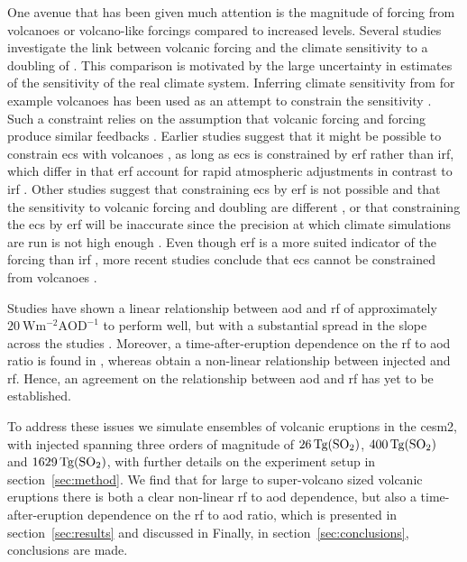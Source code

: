 \documentclass{ametsocV6.1}
\newcommand{\iso}[1][i]{{#1}njected \ce{SO2}}
\begin{document}
One avenue that has been given much attention is the magnitude of forcing from volcanoes
or volcano-like forcings compared to increased  levels. Several studies
investigate the link between volcanic forcing and the climate sensitivity to a doubling
of 
\citep{boer2007,marvel2016,merlis2014,ollila2016,richardson2019,salvi2022,wigley2005}.
This comparison is motivated by the large uncertainty in estimates of the sensitivity of
the real climate system. Inferring climate sensitivity from for example volcanoes has
been used as an attempt to constrain the sensitivity \citep{boer2007}. Such a constraint
relies on the assumption that volcanic forcing and  forcing produce similar
feedbacks \citep{pauling2023}. Earlier studies suggest that it might be possible to
constrain \gls{ecs} with volcanoes \citep{bender2010}, as long as \gls{ecs} is
constrained by \gls{erf} rather than \gls{irf}, which differ in that \gls{erf} account
for rapid atmospheric adjustments in contrast to \gls{irf} \citep{richardson2019}. Other
studies suggest that constraining \gls{ecs} by \gls{erf} is not possible and that the
sensitivity to volcanic forcing and  doubling are different
\citep{douglass2006}, or that constraining the \gls{ecs} by \gls{erf} will be inaccurate
since the precision at which climate simulations are run is not high enough
\citep{boer2007,salvi2022}. Even though \gls{erf} is a more suited indicator of the
forcing than \gls{irf} \citep{marvel2016,richardson2019}, more recent studies conclude
that \gls{ecs} cannot be constrained from volcanoes \citep{pauling2023}.

Studies have shown a linear relationship between \gls{aod} and \gls{rf} of approximately
\(\SI{20}{\watt\metre^{-2}\mathrm{AOD}^{-1}}\) to perform well, but with a substantial
spread in the slope across the studies
\citep{mills2017,hansen2005,gregory2016,marshall2020,pitari2016b}. Moreover, a
time-after-eruption dependence on the \gls{rf} to \gls{aod} ratio is found in
\citet{marshall2020}, whereas \citet{niemeier2015} obtain a non-linear relationship
between \iso{} and \gls{rf}. Hence, an agreement on the relationship between \gls{aod}
and \gls{rf} has yet to be established.

To address these issues we simulate ensembles of volcanic eruptions in the \gls{cesm2},
with \iso{} spanning three orders of magnitude of \(\SI{26}{\tera\gram(\ce{SO2})}\),
\(\SI{400}{\tera\gram(\ce{SO2})}\) and \(\SI{1629}{\tera\gram(\ce{SO2})}\), with further
details on the experiment setup in section~\ref{sec:method}. We find that for large to
super-volcano sized volcanic eruptions there is both a clear non-linear \gls{rf} to
\gls{aod} dependence, but also a time-after-eruption dependence on the \gls{rf} to
\gls{aod} ratio, which is presented in section~\ref{sec:results} and discussed in
Finally, in section~\ref{sec:conclusions}, conclusions are made.
\end{document}
